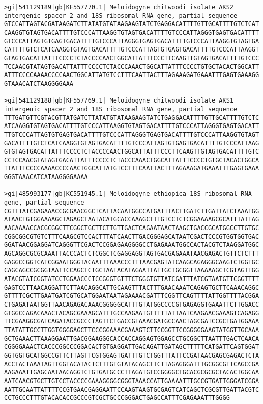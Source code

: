 \documentclass[11pt]{article}
\begin{document}
\begin{Verbatim}[commandchars=\\\{\}]
>gi|541129189|gb|KF557770.1| Meloidogyne chitwoodi isolate AKS2 intergenic spacer 2 and 18S ribosomal RNA gene, partial sequence
GTCCATTAGTACGATAAGATCTTATATGTATAAGAAGTATCTGAGGACATTTTGTTGCATTTTGTCTCAT
CAAGGTGTAGTGACATTTTGTCCCATTAAGGTGTAGTGACATTTTGTCCCATTAGGGTGAGTGACATTTT
GTCCCATTAGTGTGAGTGACATTTTGTCCCATTAGGGTGAGTGACATTTTGTCCCATTAAGGTGTAGTGA
CATTTTGTCTCATCAAGGTGTAGTGACATTTTGTCCCATTAGTGTGAGTGACATTTTGTCCCATTAAGGT
GTAGTGACATTATTTCCCCTCTACCCCAACTGGCATTATTTCCCTTCAAGTTGTAGTGACATTTTGTCCC
TCCAACGTATAGTGACATTATTTCCCCTCTACCCAAACTGGCATTATTTCCCCTGTGCTACACTGGCATT
ATTTCCCCAAAACCCCAACTGGCATTATGTCCTTTCAATTACTTTAGAAAGATGAAATTTGAGTGAAAGG
GTAAACATCTAAGGGGAAA

>gi|541129188|gb|KF557769.1| Meloidogyne chitwoodi isolate AKS1 intergenic spacer 2 and 18S ribosomal RNA gene, partial sequence
TTTGATGTTCGTACGTTATGATCTTATATGTATAAGAAGTATCTGAGGACATTTTGTTGCATTTTGTCTC
ATCAAGGTGTAGTGACATTTTGTCCCATTAAGGTGTAGTGACATTTTGTCCCATTAGGGTGAGTGACATT
TTGTCCCATTAGTGTGAGTGACATTTTGTCCCATTAGGGTGAGTGACATTTTGTCCCATTAAGGTGTAGT
GACATTTTGTCTCATCAAGGTGTAGTGACATTTTGTCCCATTAGTGTGAGTGACATTTTGTCCCATTAAG
GTGTAGTGACATTATTTCCCCTCTACCCCAACTGGCATTATTTCCCTTCAAGTTGTAGTGACATTTTGTC
CCTCCAACGTATAGTGACATTATTTCCCCTCTACCCAAACTGGCATTATTTCCCCTGTGCTACACTGGCA
TTATTTCCCCAAAACCCCAACTGGCATTATGTCCTTTCAATTACTTTAGAAAGATGAAATTTGAGTGAAA
GGGTAAACATCATAAGGGGAAAA

>gi|485993177|gb|KC551945.1| Meloidogyne ethiopica 18S ribosomal RNA gene, partial sequence
CGTTTATCGAGAAACCGCGAACGGCTCATTACAATGGCCATGATTTACTTGATCTTGATTATCTAAATGG
ATAACTGTGGAAAAGCTAGAGCTAATACATGCACCAAAGCTTTGTCCTCTCGGAAAAGCGCATTTATTAG
AACAAAACCACGCGGCTTCGGCTGCTTCTTGTTGACTCAGAATAACTAAGCTGACCGCATGGCCTTGTGC
CGGCGGCGTGTCTTTCAAGCGTCCACTTTATCAACTTGACGGGAGCATAATCGACTCCCGTGGTGGTGAC
GGATAACGGAGGATCAGGGTTCGACTCCGGAGAAGGGGCCTGAGAAATGGCCACTACGTCTAAGGATGGC
AGCAGGCGCGCAAATTACCCACTCTCGGCTCGAGGAGGTAGTGACGAGAAATAACGAGACTGTTCTCTTT
GAGGCCGGTCATCGGAATGGGTACAATTTAAACCCTTTAACGAGTATCAAGCAGAGGGCAAGTCTGGTGC
CAGCAGCCGCGGTAATTCCAGCTCTGCTAATACATAGAATTATTGCTGCGGTTAAAAAGCTCGTAGTTGG
ATACGTATCGGTATCCTGGAACCCTCCGGGTGTTTCTGGGTGTTATCGATTTATCGTAATGTTCGGTTTT
GAGTCCTTAACAGGATTCTTAACAGGCATTGCAAGTTTACTTTGAACAAATCAGAGTGCTTCAAACAGGC
GTTTTCGCTTGAATGATCGTGCATGGAATAATAGAAAACGATTTCGGTTCAGTTTTATTGGTTTTACGGA
CTGAGATAATGGTTAACAGAGACAAACGGGGGCATTTGTATGGCCCCGTGAGAGGTGAAATTCTTGGACC
GTGGCCAGACAAACTACAGCGAAAGCATTTGCCAAGAATGTTTTTATTAATCAAGAACGAAAGTCAGAGG
TTCGAAGGCGATCAGATACCGCCCTAGTTCTGACCGTAAACGATGCCAACTAGCGATCCGCTGATGGAAA
TTATATTGCCTTGGTGGGGAGCTTCCCGGAAACGAAAGTCTTCCGGTTCCGGGGGAAGTATGGTTGCAAA
GCTGAAACTTAAAGGAATTGACGGAAGGGCACCACCAGGAGTGGAGCCTGCGGCTTAATTTGACTCAACA
CGGGGAAACTCACCCGGCCCGGACACTGTGAGGATTGACAGATTGATAGCTTTTTCATGATTCAGTGGAT
GGTGGTGCATGGCCGTTCTTAGTTCGTGGAGTGATTTGTCTGGTTTATTCCGATAACGAGCGAGACTCTA
ACCTACTAAATAGTTGGTACATACTCTTTGTGTATACAGCTTCTTAGAGGGATTTGCGGCGTTCAGCCGA
AAGAAATTGAGCAATAACAGGTCTGTGATGCCCTTAGATGTCCGGGGCTGCACGCGCGCTACACTGGCAA
AATCAACGTGCTTGTCCTACCCCGAAAGGGGCGGGTAAACCATTGAAAATTTGCCGTGATTGGGATCGGA
AATTGCAATTATTTTCCGTGAACGAGGAATTCCAAGTAAGTGCGAGTCATCAGCTCGCGTTGATTACGTC
CCTGCCCTTTGTACACACCGCCCGTCGCTGCCCGGGACTGAGCCATTTCGAGAAATTTGGGG


\end{Verbatim}
\end{document}

